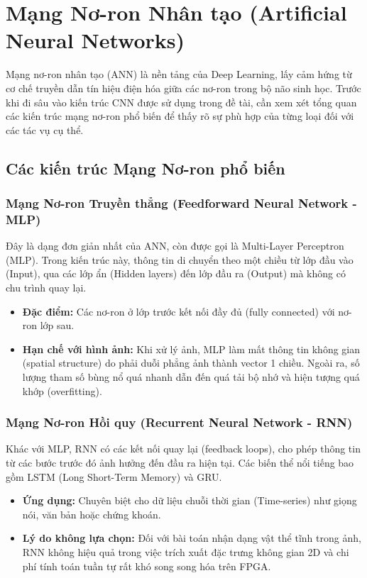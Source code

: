 \section{Mạng Nơ-ron Nhân tạo (Artificial Neural Networks)}
\label{sec:neural_network}

Mạng nơ-ron nhân tạo (ANN) là nền tảng của Deep Learning, 
lấy cảm hứng từ cơ chế truyền dẫn tín hiệu điện hóa giữa các nơ-ron 
trong bộ não sinh học. Trước khi đi sâu vào kiến trúc CNN được sử dụng trong đề tài, 
cần xem xét tổng quan các kiến trúc mạng nơ-ron phổ biến để thấy rõ sự phù hợp 
của từng loại đối với các tác vụ cụ thể.\cite{CNN}

\subsection{Các kiến trúc Mạng Nơ-ron phổ biến}

\subsubsection{Mạng Nơ-ron Truyền thẳng (Feedforward Neural Network - MLP)}
Đây là dạng đơn giản nhất của ANN, còn được gọi là Multi-Layer Perceptron (MLP). Trong kiến trúc này, thông tin di chuyển theo một chiều từ lớp đầu vào (Input), qua các lớp ẩn (Hidden layers) đến lớp đầu ra (Output) mà không có chu trình quay lại.
\begin{itemize}
    \item \textbf{Đặc điểm:} Các nơ-ron ở lớp trước kết nối đầy đủ (fully connected) với nơ-ron lớp sau.
    \item \textbf{Hạn chế với hình ảnh:} Khi xử lý ảnh, MLP làm mất thông tin không gian (spatial structure) do phải duỗi phẳng ảnh thành vector 1 chiều. Ngoài ra, số lượng tham số bùng nổ quá nhanh dẫn đến quá tải bộ nhớ và hiện tượng quá khớp (overfitting).
\end{itemize}

\subsubsection{Mạng Nơ-ron Hồi quy (Recurrent Neural Network - RNN)}
Khác với MLP, RNN có các kết nối quay lại (feedback loops), cho phép thông tin từ các bước trước đó ảnh hưởng đến đầu ra hiện tại. Các biến thể nổi tiếng bao gồm LSTM (Long Short-Term Memory) và GRU.
\begin{itemize}
    \item \textbf{Ứng dụng:} Chuyên biệt cho dữ liệu chuỗi thời gian (Time-series) như giọng nói, văn bản hoặc chứng khoán.
    \item \textbf{Lý do không lựa chọn:} Đối với bài toán nhận dạng vật thể tĩnh trong ảnh, RNN không hiệu quả trong việc trích xuất đặc trưng không gian 2D và chi phí tính toán tuần tự rất khó song song hóa trên FPGA.
\end{itemize}

